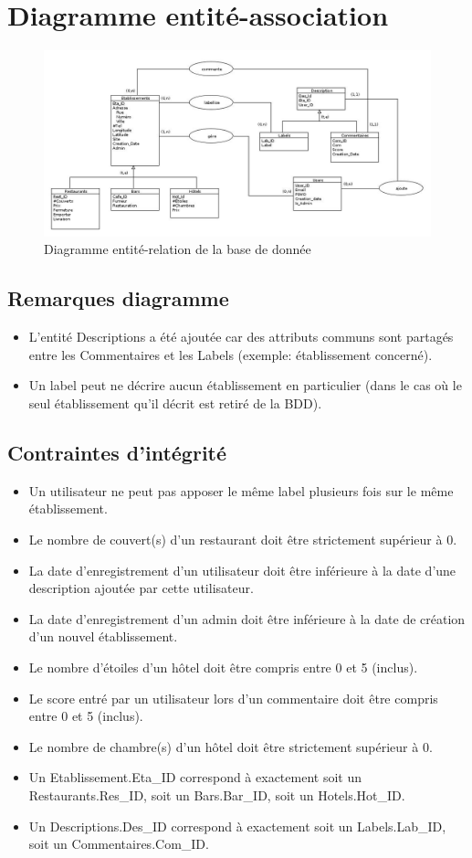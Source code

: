 \section{Diagramme entité-association}
\begin{figure}[H]
    \centering
    \includegraphics[scale=0.60, angle=90]{diaEA4}
    \caption{Diagramme entité-relation de la base de donnée}
\end{figure}
\subsection{Remarques diagramme}
\begin{itemize}
\item L'entité Descriptions a été ajoutée car des attributs communs sont partagés entre les Commentaires et les Labels (exemple: établissement concerné).
\item Un label peut ne décrire aucun établissement en particulier (dans le cas où le seul établissement qu'il décrit est retiré de la BDD).
\end{itemize}
\subsection{Contraintes d'intégrité}
\begin{itemize}
\item Un utilisateur ne peut pas apposer le même label plusieurs fois sur le même établissement.
\item Le nombre de couvert(s) d'un restaurant doit être strictement supérieur à 0.
\item La date d'enregistrement d'un utilisateur doit être inférieure à la date d'une description ajoutée par cette utilisateur.
\item La date d'enregistrement d'un admin doit être inférieure à la date de création d'un nouvel établissement.
\item Le nombre d'étoiles d'un hôtel doit être compris entre 0 et 5 (inclus).
\item Le score entré par un utilisateur lors d'un commentaire doit être compris entre 0 et 5 (inclus).
\item Le nombre de chambre(s) d'un hôtel doit être strictement supérieur à 0.
\item Un Etablissement.Eta\_ID correspond à exactement soit un Restaurants.Res\_ID, soit un Bars.Bar\_ID, soit un Hotels.Hot\_ID.
\item Un Descriptions.Des\_ID correspond à exactement soit un Labels.Lab\_ID, soit un Commentaires.Com\_ID.
\end{itemize}
\newpage